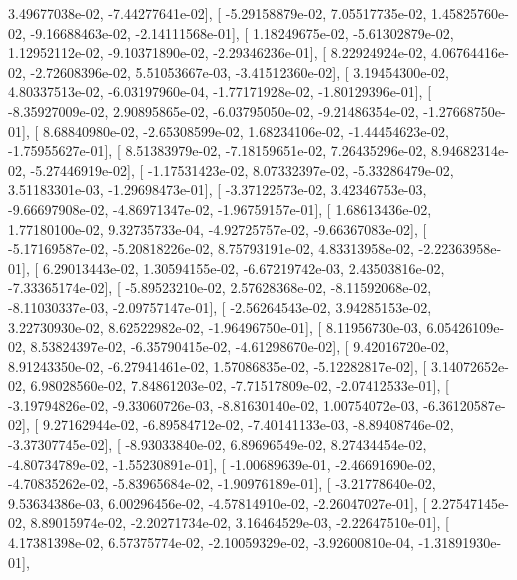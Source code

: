 \documentclass{article}
\begin{document}
          3.49677038e-02,  -7.44277641e-02],
       [ -5.29158879e-02,   7.05517735e-02,   1.45825760e-02,
         -9.16688463e-02,  -2.14111568e-01],
       [  1.18249675e-02,  -5.61302879e-02,   1.12952112e-02,
         -9.10371890e-02,  -2.29346236e-01],
       [  8.22924924e-02,   4.06764416e-02,  -2.72608396e-02,
          5.51053667e-03,  -3.41512360e-02],
       [  3.19454300e-02,   4.80337513e-02,  -6.03197960e-04,
         -1.77171928e-02,  -1.80129396e-01],
       [ -8.35927009e-02,   2.90895865e-02,  -6.03795050e-02,
         -9.21486354e-02,  -1.27668750e-01],
       [  8.68840980e-02,  -2.65308599e-02,   1.68234106e-02,
         -1.44454623e-02,  -1.75955627e-01],
       [  8.51383979e-02,  -7.18159651e-02,   7.26435296e-02,
          8.94682314e-02,  -5.27446919e-02],
       [ -1.17531423e-02,   8.07332397e-02,  -5.33286479e-02,
          3.51183301e-03,  -1.29698473e-01],
       [ -3.37122573e-02,   3.42346753e-03,  -9.66697908e-02,
         -4.86971347e-02,  -1.96759157e-01],
       [  1.68613436e-02,   1.77180100e-02,   9.32735733e-04,
         -4.92725757e-02,  -9.66367083e-02],
       [ -5.17169587e-02,  -5.20818226e-02,   8.75793191e-02,
          4.83313958e-02,  -2.22363958e-01],
       [  6.29013443e-02,   1.30594155e-02,  -6.67219742e-03,
          2.43503816e-02,  -7.33365174e-02],
       [ -5.89523210e-02,   2.57628368e-02,  -8.11592068e-02,
         -8.11030337e-03,  -2.09757147e-01],
       [ -2.56264543e-02,   3.94285153e-02,   3.22730930e-02,
          8.62522982e-02,  -1.96496750e-01],
       [  8.11956730e-03,   6.05426109e-02,   8.53824397e-02,
         -6.35790415e-02,  -4.61298670e-02],
       [  9.42016720e-02,   8.91243350e-02,  -6.27941461e-02,
          1.57086835e-02,  -5.12282817e-02],
       [  3.14072652e-02,   6.98028560e-02,   7.84861203e-02,
         -7.71517809e-02,  -2.07412533e-01],
       [ -3.19794826e-02,  -9.33060726e-03,  -8.81630140e-02,
          1.00754072e-03,  -6.36120587e-02],
       [  9.27162944e-02,  -6.89584712e-02,  -7.40141133e-03,
         -8.89408746e-02,  -3.37307745e-02],
       [ -8.93033840e-02,   6.89696549e-02,   8.27434454e-02,
         -4.80734789e-02,  -1.55230891e-01],
       [ -1.00689639e-01,  -2.46691690e-02,  -4.70835262e-02,
         -5.83965684e-02,  -1.90976189e-01],
       [ -3.21778640e-02,   9.53634386e-03,   6.00296456e-02,
         -4.57814910e-02,  -2.26047027e-01],
       [  2.27547145e-02,   8.89015974e-02,  -2.20271734e-02,
          3.16464529e-03,  -2.22647510e-01],
       [  4.17381398e-02,   6.57375774e-02,  -2.10059329e-02,
         -3.92600810e-04,  -1.31891930e-01],
\end{document}
